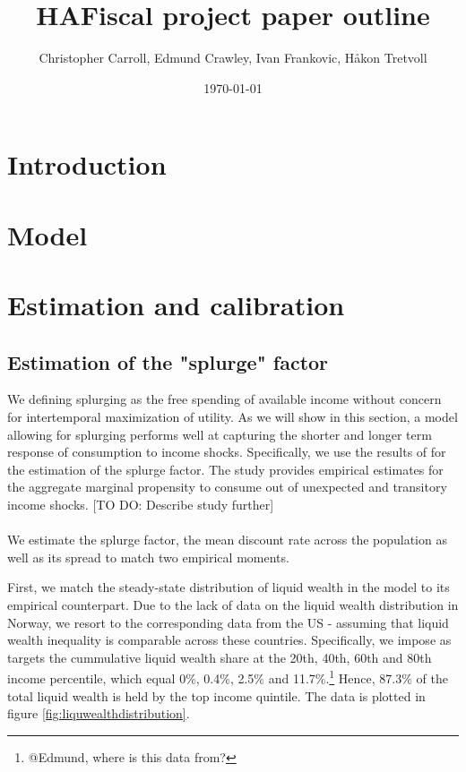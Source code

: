 \documentclass[11pt]{article}
\title{ HAFiscal project paper outline}
\author{Christopher Carroll, Edmund Crawley, Ivan Frankovic, Håkon Tretvoll}
\date{\today}
\begin{document}
	\maketitle
	
	
	\section{Introduction}
	
	\section{Model}
	
	\section{Estimation and calibration}
	
	\subsection{Estimation of the "splurge" factor}
	
	We defining splurging as the free spending of available income without concern for intertemporal maximization of utility. As we will show in this section, a model allowing for splurging performs well at capturing the shorter and longer term response of consumption to income shocks. Specifically, we use the results of	\citet{fagereng_mpc_2021} for the estimation of the splurge factor. The study provides empirical estimates for the aggregate marginal propensity to consume out of unexpected and transitory income shocks. [TO DO: Describe study further]\\
	\\	
	We estimate the splurge factor, the mean discount rate across the population as well as its spread to match two empirical moments. 
	
	First, we match the steady-state distribution of liquid wealth in the model to its empirical counterpart. Due to the lack of data on the liquid wealth distribution in Norway, we resort to the corresponding data from the US - assuming that liquid wealth inequality is comparable across these countries. Specifically, we impose as targets the cummulative liquid wealth share at the 20th, 40th, 60th and 80th income percentile, which equal 0\%, 0.4\%, 2.5\% and 11.7\%.\footnote{@Edmund, where is this data from?} Hence, 87.3\% of the total liquid wealth is  held by the top income quintile. The data is plotted in figure \ref{fig:liquwealthdistribution}.
\end{document}
